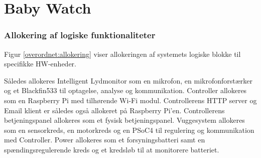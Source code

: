 \chapter{Baby Watch}




%
%




\subsection{Allokering af logiske funktionaliteter}
Figur \ref{overordnet:allokering} viser allokeringen af systemets logiske blokke til specifikke HW-enheder.

Således allokeres Intelligent Lydmonitor som en mikrofon, en mikrofonforstærker og et Blackfin533 til optagelse, analyse og kommunikation.
Controller allokeres som en Raspberry Pi med tilhørende Wi-Fi modul. Controllerens HTTP server og Email klient er således også allokeret på Raspberry Pi'en. Controllerens betjeningspanel allokeres som et fysisk betjeningspanel.
Vuggesystem allokeres som en sensorkreds, en motorkreds og en PSoC4 til regulering og kommunikation med Controller.
Power allokeres som et forsyningsbatteri samt en spændingsregulerende kreds og et kredsløb til at monitorere batteriet.


